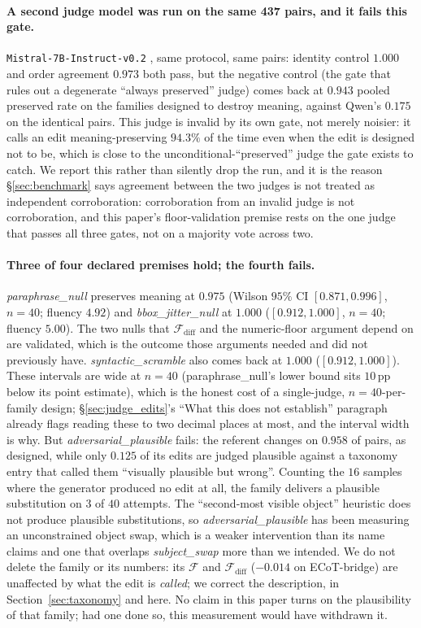 \paragraph{A second judge model was run on the same 437 pairs, and it fails this gate.} \texttt{Mistral-7B-Instruct-v0.2} \citep{mistral7b}, same protocol, same pairs: identity control $\mathbf{1.000}$ and order agreement $\mathbf{0.973}$ both pass, but the negative control (the gate that rules out a degenerate ``always preserved'' judge) comes back at $\mathbf{0.943}$ pooled preserved rate on the families designed to destroy meaning, against Qwen's $0.175$ on the identical pairs. This judge is invalid by its own gate, not merely noisier: it calls an edit meaning-preserving $94.3\%$ of the time even when the edit is designed not to be, which is close to the unconditional-``preserved'' judge the gate exists to catch. We report this rather than silently drop the run, and it is the reason \S\ref{sec:benchmark} says agreement between the two judges is not treated as independent corroboration: corroboration from an invalid judge is not corroboration, and this paper's floor-validation premise rests on the one judge that passes all three gates, not on a majority vote across two.

\paragraph{Three of four declared premises hold; the fourth fails.} \emph{paraphrase\_null} preserves meaning at $0.975$ (Wilson $95\%$ CI $[0.871, 0.996]$, $n{=}40$; fluency $4.92$) and \emph{bbox\_jitter\_null} at $1.000$ ($[0.912, 1.000]$, $n{=}40$; fluency $5.00$). The two nulls that $\mathcal{F}_{\text{diff}}$ and the numeric-floor argument depend on are validated, which is the outcome those arguments needed and did not previously have. \emph{syntactic\_scramble} also comes back at $1.000$ ($[0.912, 1.000]$). These intervals are wide at $n{=}40$ (paraphrase\_null's lower bound sits $10$\,pp below its point estimate), which is the honest cost of a single-judge, $n{=}40$-per-family design; \S\ref{sec:judge_edits}'s ``What this does not establish'' paragraph already flags reading these to two decimal places at most, and the interval width is why. But \emph{adversarial\_plausible} fails: the referent changes on $0.958$ of pairs, as designed, while only $\mathbf{0.125}$ of its edits are judged plausible against a taxonomy entry that called them ``visually plausible but wrong''. Counting the $16$ samples where the generator produced no edit at all, the family delivers a plausible substitution on $3$ of $40$ attempts. The ``second-most visible object'' heuristic does not produce plausible substitutions, so \emph{adversarial\_plausible} has been measuring an unconstrained object swap, which is a weaker intervention than its name claims and one that overlaps \emph{subject\_swap} more than we intended. We do not delete the family or its numbers: its $\mathcal{F}$ and $\mathcal{F}_{\text{diff}}$ ($-0.014$ on ECoT-bridge) are unaffected by what the edit is \emph{called}; we correct the description, in Section~\ref{sec:taxonomy} and here. No claim in this paper turns on the plausibility of that family; had one done so, this measurement would have withdrawn it.

